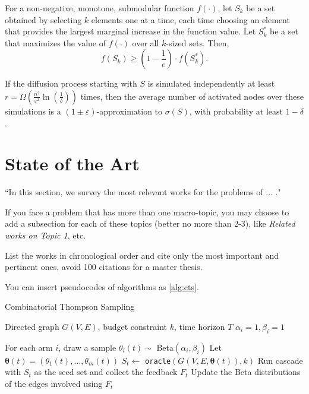 \begin{theorem}
\label{thm:approximation}
For a non-negative, monotone, submodular function $f(\cdot)$, let $S_k$ be a set obtained by selecting $k$ elements one at a time, each time choosing an element that provides the largest marginal increase in the function value. Let $S_k^*$ be a set that maximizes the value of $f(\cdot)$ over all $k$-sized sets. Then,
$$f(S_k) \geq \left( 1-\frac{1}{e} \right) \cdot f(S_k^*).$$
\end{theorem}

\begin{proposition}
\label{thm:chernoff}
If the diffusion process starting with $S$ is simulated independently at least $r=\Omega\left(\frac{n^2}{\varepsilon^2}\ln\left(\frac{1}{\delta}\right)\right)$ times, then the average number of activated nodes over these simulations is a $(1 \pm \varepsilon)$-approximation to $\sigma(S)$, with probability at least $1 - \delta$.
\end{proposition}

\section{State of the Art}
\label{sec:sota}

``In this section, we survey the most relevant works for the problems of ... ."

If you face a problem that has more than one macro-topic, you may choose to add a subsection for each of these topics (better no more than 2-3), like \emph{Related works on Topic 1}, etc.

List the works in chronological order and cite only the most important and pertinent ones, avoid 100 citations for a master thesis.

You can insert pseudocodes of algorithms as \autoref{alg:cts}.

\begin{algorithm}[t]
\caption{Combinatorial Thompson Sampling}
\label{alg:cts}
\begin{algorithmic}[1]
\Require Directed graph $G(V,E)$, budget constraint $k$, time horizon $T$
\State $\alpha_i = 1, \beta_i = 1$ 
\EndFor

\State For each arm $i$, draw a sample $\theta_i(t) \sim$ Beta$(\alpha_i, \beta_i)$
\State Let $\boldsymbol{\theta}(t) = \left(\theta_1(t), \ldots, \theta_m(t) \right)$
\State $S_t \gets$ \texttt{oracle}$(G(V,E,\boldsymbol{\theta}(t)), k)$
\State Run cascade with $S_t$ as the seed set and collect the feedback $F_t$
\State Update the Beta distributions of the edges involved using $F_t$
\EndFor
\end{algorithmic}
\end{algorithm}